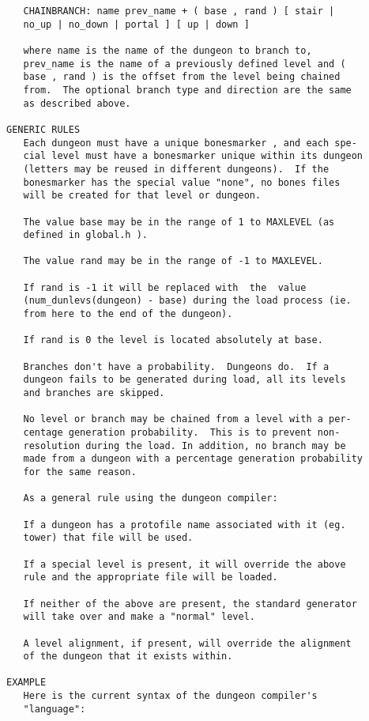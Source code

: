 \documentclass[11pt]{article}
\begin{document}
\begin{verbatim}
   CHAINBRANCH: name prev_name + ( base , rand ) [ stair |
   no_up | no_down | portal ] [ up | down ]

   where name is the name of the dungeon to branch to,
   prev_name is the name of a previously defined level and (
   base , rand ) is the offset from the level being chained
   from.  The optional branch type and direction are the same
   as described above.

GENERIC RULES
   Each dungeon must have a unique bonesmarker , and each spe-
   cial level must have a bonesmarker unique within its dungeon
   (letters may be reused in different dungeons).  If the
   bonesmarker has the special value "none", no bones files
   will be created for that level or dungeon.

   The value base may be in the range of 1 to MAXLEVEL (as
   defined in global.h ).

   The value rand may be in the range of -1 to MAXLEVEL.

   If rand is -1 it will be replaced with  the  value
   (num_dunlevs(dungeon) - base) during the load process (ie.
   from here to the end of the dungeon).

   If rand is 0 the level is located absolutely at base.

   Branches don't have a probability.  Dungeons do.  If a
   dungeon fails to be generated during load, all its levels
   and branches are skipped.

   No level or branch may be chained from a level with a per-
   centage generation probability.  This is to prevent non-
   resolution during the load. In addition, no branch may be
   made from a dungeon with a percentage generation probability
   for the same reason.

   As a general rule using the dungeon compiler:

   If a dungeon has a protofile name associated with it (eg.
   tower) that file will be used.

   If a special level is present, it will override the above
   rule and the appropriate file will be loaded.

   If neither of the above are present, the standard generator
   will take over and make a "normal" level.

   A level alignment, if present, will override the alignment
   of the dungeon that it exists within.

EXAMPLE
   Here is the current syntax of the dungeon compiler's
   "language":



\end{verbatim}
\end{document}
